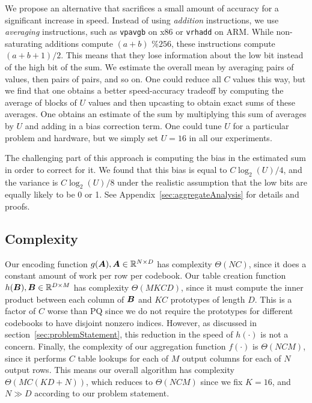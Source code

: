 We propose an alternative that sacrifices a small amount of accuracy for a significant increase in speed. Instead of using \textit{addition} instructions, we use \textit{averaging} instructions, such as \texttt{vpavgb} on x86 or \texttt{vrhadd} on ARM. While non-saturating additions compute $(a + b) \text{ \% } 256$, these instructions compute $(a + b + 1) / 2$. This means that they lose information about the low bit instead of the high bit of the sum. We estimate the overall mean by averaging pairs of values, then pairs of pairs, and so on. One could reduce all $C$ values this way, but we find that one obtains a better speed-accuracy tradeoff by computing the average of blocks of $U$ values and then upcasting to obtain exact sums of these averages. One obtains an estimate of the sum by multiplying this sum of averages by $U$ and adding in a bias correction term. One could tune $U$ for a particular problem and hardware, but we simply set $U = 16$ in all our experiments.

The challenging part of this approach is computing the bias in the estimated sum in order to correct for it. We found that this bias is equal to $C \log_2(U) / 4$, and the variance is $C \log_2(U) / 8$ under the realistic assumption that the low bits are equally likely to be 0 or 1. See Appendix~\ref{sec:aggregateAnalysis} for details and proofs.

\subsection{Complexity}

Our encoding function $g(\bm{A}), \bm{A} \in \mathbb{R}^{N \times D}$ has complexity $\Theta(NC)$, since it does a constant amount of work per row per codebook. Our table creation function $h(\bm{B}), \bm{B} \in \mathbb{R}^{D \times M}$ has complexity $\Theta(MKCD)$, since it must compute the inner product between each column of $\bm{B}$ and $KC$ prototypes of length $D$. This is a factor of $C$ worse than PQ since we do not require the prototypes for different codebooks to have disjoint nonzero indices. However, as discussed in section~\ref{sec:problemStatement}, this reduction in the speed of $h(\cdot)$ is not a concern. Finally, the complexity of our aggregation function $f(\cdot)$ is $\Theta(NCM)$, since it performs $C$ table lookups for each of $M$ output columns for each of $N$ output rows. This means our overall algorithm has complexity $\Theta(MC(KD + N))$, which reduces to $\Theta(NCM)$ since we fix $K = 16$, and $N \gg D$ according to our problem statement.

